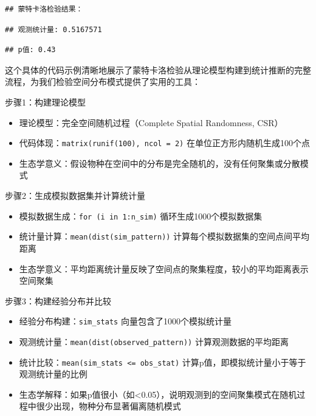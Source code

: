 \documentclass[
  twoside,12pt,fontset=none]{ctexbook}
\providecommand{\tightlist}{%
  \setlength{\itemsep}{0pt}\setlength{\parskip}{0pt}}
\begin{document}
\begin{verbatim}
## 蒙特卡洛检验结果：
\end{verbatim}

\begin{verbatim}
## 观测统计量: 0.5167571
\end{verbatim}

\begin{verbatim}
## p值: 0.43
\end{verbatim}

这个具体的代码示例清晰地展示了蒙特卡洛检验从理论模型构建到统计推断的完整流程，为我们检验空间分布模式提供了实用的工具：

步骤1：构建理论模型

\begin{itemize}
\tightlist
\item
  理论模型：完全空间随机过程（Complete Spatial Randomness, CSR）
\item
  代码体现：\texttt{matrix(runif(100),\ ncol\ =\ 2)} 在单位正方形内随机生成100个点
\item
  生态学意义：假设物种在空间中的分布是完全随机的，没有任何聚集或分散模式
\end{itemize}

步骤2：生成模拟数据集并计算统计量

\begin{itemize}
\tightlist
\item
  模拟数据生成：\texttt{for\ (i\ in\ 1:n\_sim)} 循环生成1000个模拟数据集
\item
  统计量计算：\texttt{mean(dist(sim\_pattern))} 计算每个模拟数据集的空间点间平均距离
\item
  生态学意义：平均距离统计量反映了空间点的聚集程度，较小的平均距离表示空间聚集
\end{itemize}

步骤3：构建经验分布并比较

\begin{itemize}
\tightlist
\item
  经验分布构建：\texttt{sim\_stats} 向量包含了1000个模拟统计量
\item
  观测统计量：\texttt{mean(dist(observed\_pattern))} 计算观测数据的平均距离
\item
  统计比较：\texttt{mean(sim\_stats\ \textless{}=\ obs\_stat)} 计算p值，即模拟统计量小于等于观测统计量的比例
\item
  生态学解释：如果p值很小（如\textless0.05），说明观测到的空间聚集模式在随机过程中很少出现，物种分布显著偏离随机模式
\end{itemize}
\end{document}
